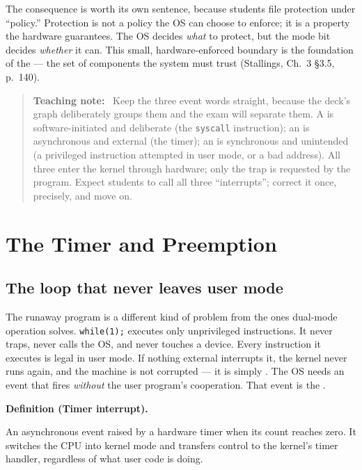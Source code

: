 \documentclass[11pt]{article}
\newenvironment{definitionbox}[1]{%
  \par\noindent\textbf{Definition (#1).}\ \itshape
}{\par\vspace{0.3em}}
\newenvironment{teachingaside}{\begin{quote}\small\color{primary-gold}\textbf{Teaching note:}\ }{\end{quote}}
\begin{document}
The consequence is worth its own sentence, because students file protection under ``policy.'' Protection is not a policy the OS can choose to enforce; it is a property the hardware guarantees. The OS decides \emph{what} to protect, but the mode bit decides \emph{whether} it can. This small, hardware-enforced boundary is the foundation of the  --- the set of components the system must trust (Stallings, Ch.~3 §3.5, p.~140).

\begin{teachingaside}
Keep the three event words straight, because the deck's graph deliberately groups them and the exam will separate them. A  is software-initiated and deliberate (the \texttt{syscall} instruction); an  is asynchronous and external (the timer); an  is synchronous and unintended (a privileged instruction attempted in user mode, or a bad address). All three enter the kernel through hardware; only the trap is requested by the program. Expect students to call all three ``interrupts''; correct it once, precisely, and move on.
\end{teachingaside}

\section{The Timer and Preemption}

\subsection*{The loop that never leaves user mode}

The runaway program is a different kind of problem from the ones dual-mode operation solves. \texttt{while(1);} executes only unprivileged instructions. It never traps, never calls the OS, and never touches a device. Every instruction it executes is legal in user mode. If nothing external interrupts it, the kernel never runs again, and the machine is not corrupted --- it is simply . The OS needs an event that fires \emph{without} the user program's cooperation. That event is the .

\begin{definitionbox}{Timer interrupt}
An asynchronous event raised by a hardware timer when its count reaches zero. It switches the CPU into kernel mode and transfers control to the kernel's timer handler, regardless of what user code is doing.
\end{definitionbox}
\end{document}

